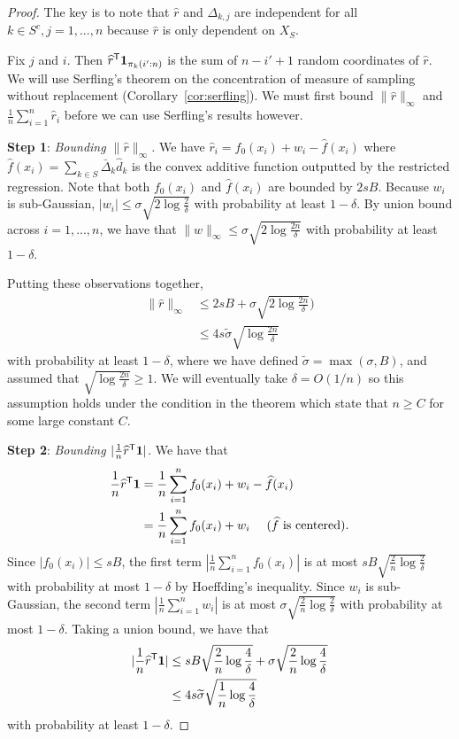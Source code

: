 \documentclass[12pt,pdftex,aos,noinfoline,addressasfootnote]{imsart}
\begin{document}
\begin{proof}
The key is to note that $\hat{r}$ and $\Delta_{k,j}$ are independent for all $k \in S^c,j=1,...,n$ because $\hat{r}$ is only dependent on $X_{S}$.

Fix $j$ and $i$. Then $\widehat{r}^{\mathsf{T}} \mbox{\boldmath $1$}_{\pi_k(i':n)}$ is the sum
of $n-i'+1$ random coordinates of $\hat{r}$. We will use
Serfling's theorem on the concentration of measure of sampling without
replacement (Corollary~\ref{cor:serfling}). We must first bound $\|
\hat{r} \|_\infty$ and $\frac{1}{n} \sum_{i=1}^n \hat{r}_i$ before we
can use Serfling's results however.

\vskip5pt
\textbf{Step 1}: {\it Bounding $\| \hat{r} \|_\infty$.} We have $\hat{r}_i = f_0(x_i) + w_i - \hat{f}(x_i)$ where
$\hat{f}(x_i) = \sum_{k \in S} \bar{\Delta}_k \hat{d}_k$ is the convex
additive function outputted by the restricted regression. Note that
both $f_0(x_i)$ and $\hat{f}(x_i)$ are bounded by $2sB$. 
Because $w_i$ is sub-Gaussian, $|w_i| \leq  \sigma \sqrt{2\log \frac{2}{\delta}}$ with probability at least $1-\delta$. By union bound across $i=1,...,n$, we have that $\| w\|_\infty \leq \sigma \sqrt{ 2 \log \frac{2n}{\delta}}$ with probability at least $1 - \delta$.

Putting these observations together,
\begin{align}
\| \hat{r} \|_\infty &\leq 2sB + \sigma \sqrt{ 2\log \frac{2n}{\delta}}) \nonumber \\
      &\leq 4 s \tilde{\sigma} \sqrt{\log \frac{2n}{\delta}} \label{eqn:stepone_rhat}
\end{align}
with probability at least $1 - \delta$, where we have defined
$\tilde{\sigma} = \max(\sigma, B)$,
and assumed that $\sqrt{\log \frac{2n}{\delta}} \geq 1$. We will eventually take $\delta = O(1/n)$ so this assumption holds under the condition in the theorem which state that $n \geq C$ for some large constant $C$.

\vskip5pt
\textbf{Step 2}: {\it Bounding $| \frac{1}{n} \widehat{r}^{\mathsf{T}} \mbox{\boldmath $1$}
  |$.}  We have that 
\begin{align*}
\frac{1}{n} \widehat{r}^{\mathsf{T}} \mbox{\boldmath $1$} &= 
    \frac{1}{n} \sum_{i=1}^n f_0(x_i) + w_i - \widehat{f}(x_i) \\
  &= \frac{1}{n} \sum_{i=1}^n f_0(x_i) + w_i \quad \textrm{ ($\widehat{f}$ is centered)}.
\end{align*}
Since $|f_0(x_i)| \leq sB$, the first term $| \frac{1}{n} \sum_{i=1}^n
f_0(x_i)|$ is at most $sB \sqrt{\frac{2}{n} \log \frac{2}{\delta}}$
with probability at most $1-\delta$ by Hoeffding's inequality. Since
$w_i$ is sub-Gaussian, the second term $|\frac{1}{n} \sum_{i=1}^n
w_i|$ is at most $\sigma \sqrt{ \frac{2}{n} \log \frac{2}{\delta}}$
with probability at most $1-\delta$.  
Taking a union bound, we have that 
\begin{align}
| \frac{1}{n} \widehat{r}^{\mathsf{T}} \mbox{\boldmath $1$}| &\leq sB \sqrt{\frac{2}{n} \log \frac{4}{\delta}} +  \sigma \sqrt{\frac{2}{n} \log \frac{4}{\delta}} \nonumber \\
  &\leq 4 s \widetilde{\sigma} \sqrt{\frac{1}{n} \log \frac{4}{\delta}} \label{eqn:steptwo_rhat}
\end{align}
with probability at least $1-\delta$.


\end{proof}
\end{document}
